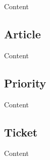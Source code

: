 Content


\subsection{Article}

Content


\subsection{Priority}

Content



\subsection{Ticket}

Content



